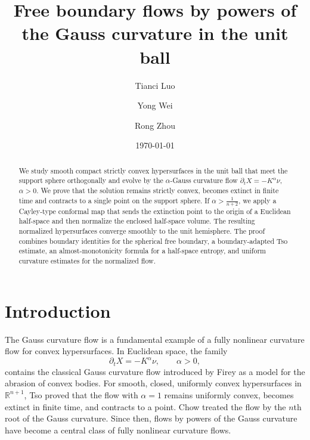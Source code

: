 \documentclass[11pt, reqno]{amsart}
\theoremstyle{remark}
\theoremstyle{definition}
\numberwithin{equation}{section}
\begin{document}
\title{Free boundary flows by powers of the Gauss curvature in the unit ball}

\author[T. Luo]{Tianci Luo}
\author[Y. Wei]{Yong Wei}
\author[R. Zhou]{Rong Zhou}
\address{School of Mathematical Sciences, University of Science and Technology of China, Hefei 230026, P.R. China}


\date{\today}


\begin{abstract}
We study smooth compact strictly convex hypersurfaces in the unit ball that meet the support sphere orthogonally and evolve by the $\alpha$-Gauss curvature flow $\partial_tX=-K^\alpha\nu$, $\alpha>0$.  We prove that the solution remains strictly convex,  becomes extinct in finite time and contracts to a single point on the support sphere. If $\alpha >\frac{1}{n+2}$, we apply a Cayley-type conformal map that sends the extinction point to the origin of a Euclidean
half-space and then normalize the enclosed half-space volume. The resulting normalized hypersurfaces converge smoothly to the unit hemisphere.  The proof combines boundary identities for the spherical free boundary, a boundary-adapted Tso estimate, an almost-monotonicity
formula for a half-space entropy, and uniform curvature estimates for the normalized flow.
\end{abstract}

\maketitle
\tableofcontents


\section{Introduction}
\label{sec:intro}

The Gauss curvature flow is a fundamental example of a fully nonlinear
curvature flow for convex hypersurfaces. In Euclidean space, the family
\begin{equation}\label{eq:closed-alpha-intro}
    \partial_tX=-K^\alpha\nu,
    \qquad
    \alpha>0,
\end{equation}
contains the classical Gauss curvature flow introduced by Firey
\cite{Firey1974} as a model for the abrasion of convex bodies. For
smooth, closed, uniformly convex hypersurfaces in
$\mathbb R^{n+1}$, Tso \cite{Tso1985} proved that the flow with
$\alpha=1$ remains uniformly convex, becomes extinct in finite time,
and contracts to a point. Chow \cite{chow85} treated the flow by the
$n$th root of the Gauss curvature. Since then, flows by powers of the
Gauss curvature have become a central class of fully nonlinear
curvature flows.
\end{document}
